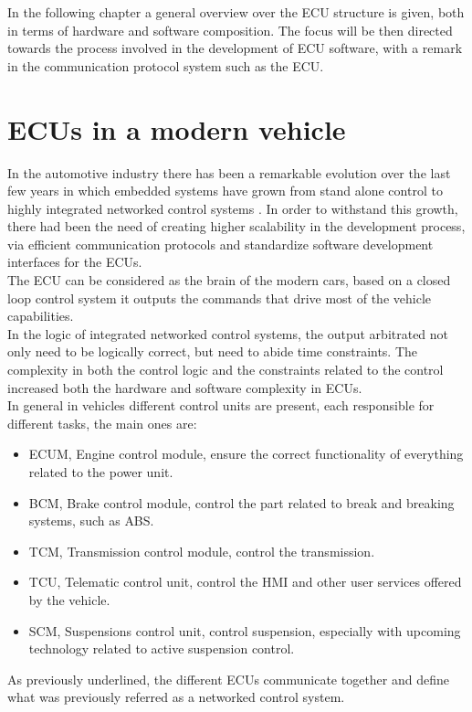 \documentclass[../main.tex]{subfiles}
\begin{document}
In the following chapter a general overview over the ECU structure is given, both in terms of hardware and software composition. The focus will be then directed towards the process involved in the development of \gls{ECU} software, with a remark in the communication protocol system such as the \gls{ECU}. 
\section{ECUs in a modern vehicle}
In the automotive industry there has been a remarkable evolution over the last few years in which embedded systems have grown from stand alone control to highly integrated networked control systems \cite{Johansson_vehicleapplications}. In order to withstand this growth, there had been the need of creating higher scalability in the development process, via efficient communication protocols and standardize software development interfaces for the \gls{ECU}s.\\
The \gls{ECU} can be considered as the brain of the modern cars, based on a closed loop control system it outputs the commands that drive most of the vehicle capabilities.\\
In the logic of integrated networked control systems, the output arbitrated not only need to be logically correct, but need to abide time constraints. The complexity in both the control logic and the constraints related to the control increased both the hardware and software complexity in \gls{ECU}s.\\
In general in vehicles different control units are present, each responsible for different tasks, the main ones are:
\begin{itemize}
    \item \gls{ECUM}, Engine control module, ensure the correct functionality of everything related to the power unit.
    \item \gls{BCM}, Brake control module, control the part related to break and breaking systems, such as \gls{ABS}.
    \item \gls{TCM}, Transmission control module, control the transmission.
    \item \gls{TCU}, Telematic control unit, control the \gls{HMI} and other user services offered by the vehicle. 
    \item \gls{SCM}, Suspensions control unit, control suspension, especially with upcoming technology related to active suspension control. 
\end{itemize}
As previously underlined, the different \gls{ECU}s communicate together and define what was previously referred as a networked control system. 
\end{document}
